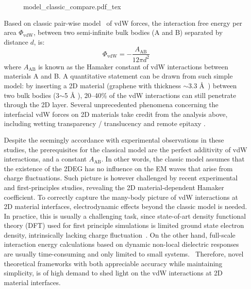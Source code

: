 \begin{figure}[h]
  \centering
  {model_classic_compare.pdf_tex}
  \caption{\label{fig:vdw-compare-classic}%
  }
\end{figure}
Based on classic pair-wise model~\cite{Hamaker_1937_vdW} of vdW
forces, the interaction free energy per area $\Phi_{\mathrm{vdW}}$,
between two semi-infinite bulk bodies (A and B) separated by distance
$d$, is:
\begin{equation}
  \label{eq:vdw-hamaker-res}
  \Phi_{\mathrm{vdW}} = - \frac{A_{\mathrm{AB}}}{12 \pi d^{2}}
\end{equation}
where $A_{\mathrm{AB}}$ is known as the Hamaker constant of vdW
interactions between materials A and B.
%
A quantitative statement can be drawn from such simple model: by inserting a 2D material (\eg graphene
with thickness $\sim{}$3.3 \AA{}~\cite{Shearer_2016}) between two bulk
bodies (3$\sim{}$5 \AA{} ), 20--40\% of the vdW
interactions can still penetrate through the 2D layer.
%
Several unprecedented phenomena concerning the interfacial vdW forces
on 2D materials take credit from the analysis above, including wetting
transparency / translucency
\cite{Shih_2012_prl,rafiee_2012_transparency,Gurarslan_2016_screen_MoS2} and remote
epitaxy \cite{Kim_2017_remote_epi_Gr,Kong_2018_pol}.

Despite the seemingly accordance with experimental observations in
these studies, the prerequisites for the classical model are the
perfect additivity of vdW interactions, and a constant
$A_{\mathrm{AB}}$. 
%
In other words, the classic model assumes that the existence of the
2DEG has no influence on the EM waves that arise from charge
fluctuations.
%
Such picture is however challenged by recent experimental
\cite{Tsoi_2014_vdW_screening_2D} and first-principles
\cite{Ambrosetti_2018_carbon,Liu_2018_gr,Li_2018_screen} studies,
revealing the 2D material-dependent Hamaker coefficient.
%
To correctly capture the many-body picture of vdW interactions at 2D
material interfaces, electro\-dynamic effects beyond the classic model
is needed.
%
In practice, this is usually a challenging task, since state-of-art
density functional theory (DFT) used for first principle simulations
is limited ground state electron density, intrinsically lacking charge
fluctuation~\cite{Woods_2016_rev_vdw}.
%
On the other hand, full-scale interaction energy calculations based on
dynamic non-local dielectric responses are usually time-consuming and
only limited to small
systems.~\cite{Hermann_2017_vdW_rev,Zhou_2017_lifshitz}
%
Therefore, novel theoretical frameworks with both appreciable accuracy
while maintaining simplicity, is of high demand to shed light on the
vdW interactions at 2D material interfaces.


